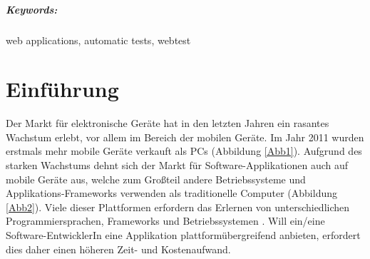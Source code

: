 \documentclass[a4paper,bibtotoc,oneside]{scrbook}
\begin{document}
\vfill
\paragraph*{Keywords:} web applications, automatic tests, webtest
\newpage


\tableofcontents\thispagestyle{empty}
\newpage

\setcounter{page}{1}

\chapter{Einführung}
Der Markt für elektronische Geräte hat in den letzten Jahren ein rasantes Wachstum erlebt, vor allem im Bereich der mobilen Geräte. Im Jahr 2011 wurden erstmals mehr mobile Geräte verkauft als PCs (Abbildung \ref{Abb1}).
Aufgrund des starken Wachstums dehnt sich der Markt für Software-Applikationen auch auf mobile Geräte aus, welche zum Großteil andere Betriebssysteme und Applikations-Frameworks verwenden als traditionelle Computer (Abbildung \ref{Abb2}). Viele dieser Plattformen erfordern das Erlernen von unterschiedlichen Programmiersprachen, Frameworks und Betriebssystemen \cite{android}\cite{ios}. Will ein/eine Software-EntwicklerIn eine Applikation plattformübergreifend anbieten, erfordert dies daher einen höheren Zeit- und Kostenaufwand.
\end{document}
